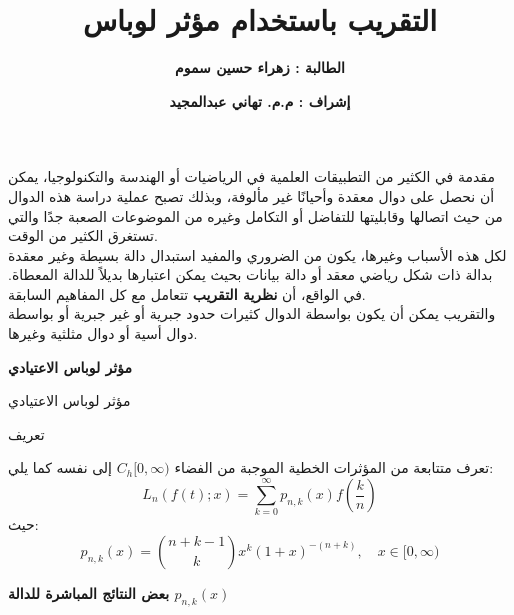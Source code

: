 


\title{
\textbf{التقريب باستخدام مؤثر لوباس}
}

\author{
\textbf{الطالبة : زهراء حسين سموم}
}
\date{
\textbf{إشراف : م.م. تهاني عبدالمجيد}
}


	\begin{frame}
		\maketitle
	\end{frame}
	
	\timesfont
	\begin{frame}{مقدمة}
		في الكثير من التطبيقات العلمية في الرياضيات أو الهندسة والتكنولوجيا، يمكن أن نحصل على دوال معقدة وأحيانًا غير مألوفة، وبذلك تصبح عملية دراسة هذه الدوال من حيث اتصالها وقابليتها للتفاضل أو التكامل وغيره من الموضوعات الصعبة جدًا والتي تستغرق الكثير من الوقت.\\
		\noindent  		
		لكل هذه الأسباب وغيرها، يكون من الضروري والمفيد استبدال دالة بسيطة وغير معقدة بدالة ذات شكل رياضي معقد أو دالة بيانات بحيث يمكن اعتبارها بديلاً للدالة المعطاة. في الواقع، أن \textbf{نظرية التقريب} تتعامل مع كل المفاهيم السابقة.\\
		\noindent
		والتقريب يمكن أن يكون بواسطة الدوال كثيرات حدود جبرية أو غير جبرية أو بواسطة دوال أسية أو دوال مثلثية وغيرها.
		
	\end{frame}
	
	\begin{frame}
\begin{center}
			\Huge\textbf{مؤثر لوباس الاعتيادي}
\end{center}
	\end{frame}
	
	\begin{frame}{مؤثر لوباس الاعتيادي}
	\begin{exampleblock}{تعريف}

		
		تعرف متتابعة من المؤثرات الخطية الموجبة من الفضاء $C_h[0, \infty)$ إلى نفسه كما يلي:
		\[
		L_n(f(t); x) = \sum_{k=0}^{\infty} p_{n,k} (x) f\left(\frac{k}{n}\right)
		\]
		حيث:
		\[
		p_{n,k} (x) = \binom{n+k-1}{k} x^k (1+x)^{-(n+k)}, \quad x \in [0, \infty)
		\]
	\end{exampleblock}
	\end{frame}
	
	\begin{frame}
		\begin{center}
			\Huge
			\textbf{بعض النتائج المباشرة للدالة $p_{n,k}(x)$}
		\end{center}
	\end{frame}
	

